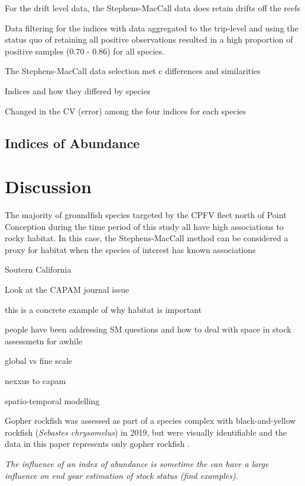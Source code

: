 \documentclass[
  authoryear,
  preprint,
  3p]{elsarticle}
\begin{document}
For the drift level data, the Stephens-MacCall data does retain drifts
off the reefs

Data filtering for the indices with data aggregated to the trip-level
and using the status quo of retaining all positive observations resulted
in a high proportion of positive samples (0.70 - 0.86) for all species.

The Stephens-MacCall data selection met c differences and similarities

Indices and how they differed by species

Changed in the CV (error) among the four indices for each species

\hypertarget{indices-of-abundance-1}{%
\subsection{Indices of Abundance}\label{indices-of-abundance-1}}

\FloatBarrier

\hypertarget{discussion}{%
\section{Discussion}\label{discussion}}

The majority of groundfish species targeted by the CPFV fleet north of
Point Conception during the time period of this study all have high
associations to rocky habitat. In this case, the Stephens-MacCall method
can be considered a proxy for habitat when the species of interest has
known associations

Soutern California

Look at the CAPAM journal issue

this is a concrete example of why habitat is important

people have been addressing SM questions and how to deal with space in
stock assessmetn for awhile

global vs fine scale

nexxus to capam

spatio-temporal modelling

Gopher rockfish was assessed as part of a species complex with
black-and-yellow rockfish (\emph{Sebastes chrysomelus}) in 2019, but
were visually identifiable and the data in this paper represents only
gopher rockfish \citep{Monk:2019:CSG}.

\emph{The influence of an index of abundance is sometime the can have a
large influence on end year estimation of stock status (find examples).}
\end{document}
